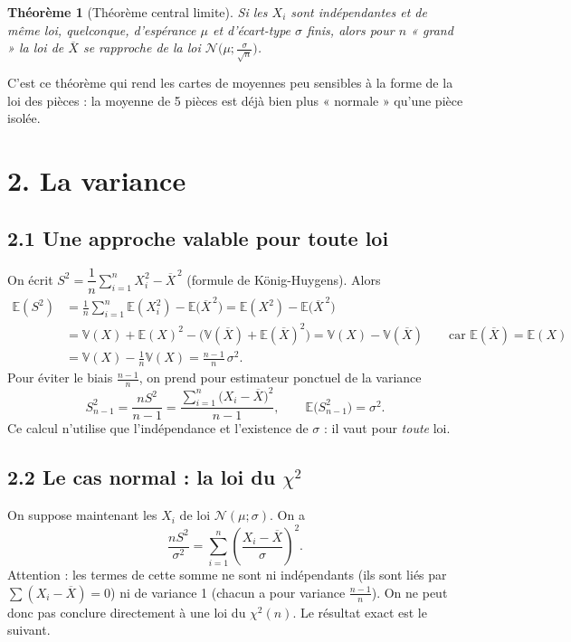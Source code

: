 \documentclass[11pt,a4paper]{article}
\theoremstyle{sj}
\newtheorem*{thm}{Théorème}
\theoremstyle{remark}
\newcommand{\E}{\mathbb{E}}
\newcommand{\V}{\mathbb{V}}
\newcommand{\N}{\mathcal{N}}
\newcommand{\Xb}{\overline{X}}
\begin{document}
\begin{thm}[Théorème central limite]
Si les $X_i$ sont indépendantes et de même loi, \emph{quelconque}, d'espérance $\mu$ et d'écart-type $\sigma$ finis, alors pour $n$ « grand » la loi de $\Xb$ se rapproche de la loi $\N\big(\mu;\frac{\sigma}{\sqrt n}\big)$.
\end{thm}

C'est ce théorème qui rend les cartes de moyennes peu sensibles à la forme de la loi des pièces : la moyenne de 5 pièces est déjà bien plus « normale » qu'une pièce isolée.

\section*{2. La variance}

\subsection*{2.1 Une approche valable pour toute loi}

On écrit $S^2=\dfrac{1}{n}\sum_{i=1}^nX_i^2-\Xb^{\,2}$ (formule de König-Huygens). Alors
\begin{align*}
\E(S^2)&=\frac1n\sum_{i=1}^n\E(X_i^2)-\E\big(\Xb^{\,2}\big)=\E(X^2)-\E\big(\Xb^{\,2}\big)\\
&=\V(X)+\E(X)^2-\Big(\V(\Xb)+\E(\Xb)^2\Big)=\V(X)-\V(\Xb)\qquad\text{car }\E(\Xb)=\E(X)\\
&=\V(X)-\frac1n\V(X)=\frac{n-1}{n}\,\sigma^2 .
\end{align*}
Pour éviter le biais $\frac{n-1}{n}$, on prend pour estimateur ponctuel de la variance
\[
S_{n-1}^2=\frac{nS^2}{n-1}=\frac{\sum_{i=1}^n\big(X_i-\Xb\big)^2}{n-1},\qquad \E\big(S_{n-1}^2\big)=\sigma^2 .
\]
Ce calcul n'utilise que l'indépendance et l'existence de $\sigma$ : il vaut pour \emph{toute} loi.

\subsection*{2.2 Le cas normal : la loi du \texorpdfstring{$\chi^2$}{khi-deux}}

On suppose maintenant les $X_i$ de loi $\N(\mu;\sigma)$. On a
\[
\frac{nS^2}{\sigma^2}=\sum_{i=1}^n\left(\frac{X_i-\Xb}{\sigma}\right)^2 .
\]
Attention : les termes de cette somme ne sont ni indépendants (ils sont liés par $\sum(X_i-\Xb)=0$) ni de variance 1 (chacun a pour variance $\frac{n-1}{n}$). On ne peut donc pas conclure directement à une loi du $\chi^2(n)$. Le résultat exact est le suivant.
\end{document}

